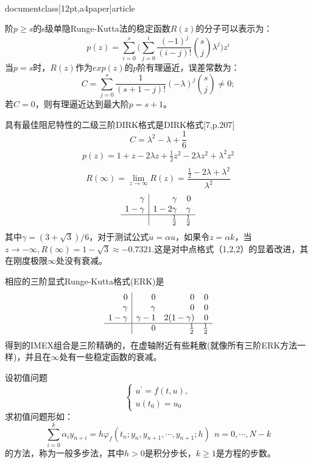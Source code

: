 \\documentclass[12pt,a4paper]{article}
\begin{document}
阶$p\ge s$的s级单隐Runge-Kutta法的稳定函数$R(z)$的分子可以表示为：
\begin{equation*}
p(z)=\sum_{i=0}^{s}\bigg(\sum_{j=0}^{i}\frac{(-1)^j}{(i-j)!}\binom{s}{j}\lambda^j\biggl)z^i
\end{equation*}
当$p=s$时，$R(z)$作为$exp(z)$的$p$阶有理逼近，误差常数为：
\begin{equation*}
C=\sum_{j=0}^{s}\frac{1}{(s+1-j)!}(-\lambda)^j\binom{s}{j}\ne 0;
\end{equation*}
若$C=0$，则有理逼近达到最大阶$p=s+1$。

具有最佳阻尼特性的二级三阶DIRK格式是DIRK格式[7,p.207]
\begin{equation*}
C=\lambda^2-\lambda+\frac{1}{6}
\end{equation*}
\begin{gather*}
p(z)=1+z-2\lambda z+\frac{1}{2}z^2-2\lambda z^2+\lambda^2z^2\\
\end{gather*}
\begin{equation*}
R(\infty)=\lim\limits_{z\to \infty}R(z)=\frac{\frac{1}{2}-2\lambda+\lambda^2}{\lambda^2}
\end{equation*}
\[
\begin{array}{r|rr}
\gamma & \gamma & 0 \\
1-\gamma & 1-2\gamma & \gamma  \\
\hline
& \frac{1}{2} & \frac{1}{2}
\end{array}
\]
其中$\gamma=(3+\sqrt{3})/6$，对于测试公式$\dot{u}=\alpha u$，如果令$z=\alpha k$，当$z\to -\infty,R(\infty)=1-\sqrt{3}\approx -0.7321.$这是对中点格式（1,2,2）的显着改进，其在刚度极限$\infty$处没有衰减。

相应的三阶显式Runge-Kutta格式(ERK)是
\[
\begin{array}{r|rrr}
0 & 0 & 0 & 0\\
\gamma & \gamma & 0 & 0\\
1-\gamma & \gamma -1 & 2(1-\gamma ) & 0\\
\hline
& 0 & \frac{1}{2} & \frac{1}{2}
\end{array}
\]
得到的IMEX组合是三阶精确的，在虚轴附近有些耗散(就像所有三阶ERK方法一样)，并且在$\infty$处有一些稳定函数的衰减。

设初值问题
\begin{equation*}
\begin{cases}
u^{'}=f(t,u),\\
u(t_{0})=u_{0}
\end{cases}
\end{equation*}
求初值问题形如：
\begin{equation}
\sum_{i=0}^{k}\alpha_{i}y_{n+i}=h\varphi_{f}(t_{n};y_{n},y_{n+1},\cdots,y_{n+1};h)~~n=0,\cdots,N-k
\label{27}
\end{equation}
的方法，称为一般多步法，其中$h>0$是积分步长，$k\ge 1$是方程的步数。
\end{document}
